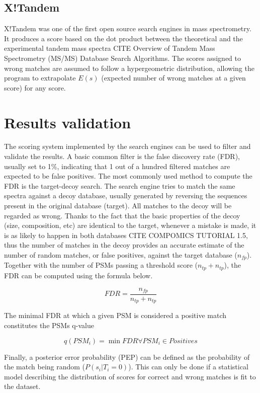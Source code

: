\documentclass[11pt, a4paper]{report}
\begin{document}
\subsection{X!Tandem}

X!Tandem was one of the first open source search engines in mass spectrometry. It produces a score based on the dot product between the theoretical and the experimental tandem mass spectra CITE Overview of Tandem Mass Spectrometry (MS/MS) Database Search Algorithms. The scores assigned to wrong matches are assumed to follow a hypergeometric distribution, allowing the program to extrapolate $E(s)$ (expected number of wrong matches at a given score) for any score.

\section{Results validation}
\label{sec:validation}

The scoring system implemented by the search engines can be used to filter and validate the results. A basic common filter is the false discovery rate (FDR), usually set to 1\%, indicating that 1 out of a hundred filtered matches are expected to be false positives. The most commonly used method to compute the FDR is the target-decoy search. The search engine tries to match the same spectra against a decoy database, usually generated by reversing the sequences present in the original database (target). All matches to the decoy will be regarded as wrong. Thanks to the fact that the basic properties of the decoy (size, composition, etc) are identical to the target, whenever a mistake is made, it is as likely to happen in both databases CITE COMPOMICS TUTORIAL 1.5, thus the number of matches in the decoy provides an accurate estimate of the number of random matches, or false positives, against the target database ($n_{fp}$). Together with the number of PSMs passing a threshold score ($n_{tp} + n_{tp}$), the FDR can be computed using the formula below.

$$FDR = \frac{n_{fp}}{n_{tp} + n_{tp}}$$

The minimal FDR at which a given PSM is considered a positive match constitutes the PSM\textquotesingle s q-value

$$ q(PSM_i) = \min FDR \forall PSM_i \in Positives$$

Finally, a posterior error probability (PEP) can be defined as the probability of the match being random ($P(s_i | T_i = 0)$). This can only be done if a statistical model describing the distribution of scores for correct and wrong matches is fit to the dataset.
\end{document}
